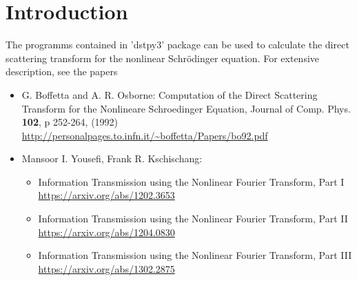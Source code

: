\documentclass{article}
\begin{document}
\section{Introduction}
The programms contained in 'dstpy3' package can be used to calculate the direct scattering transform for the nonlinear Schr\"odinger equation.
For extensive description, see the papers 
\begin{itemize}
\item G. Boffetta and A. R. Osborne:	 Computation of the Direct Scattering Transform for the Nonlineare Schroedinger Equation, Journal of Comp. Phys. {\bf 102}, p 252-264, (1992)	  \\
\url{http://personalpages.to.infn.it/~boffetta/Papers/bo92.pdf}

\item Mansoor I. Yousefi, Frank R. Kschischang:	 
\begin{itemize}
   \item Information Transmission using the Nonlinear Fourier Transform, Part I
										 \url{https://arxiv.org/abs/1202.3653}
		\item Information Transmission using the Nonlinear Fourier Transform, Part II
											 \url{https://arxiv.org/abs/1204.0830}
\item 											 Information Transmission using the Nonlinear Fourier Transform, Part III
											 \url{https://arxiv.org/abs/1302.2875}
\end{itemize}
\end{itemize}
\end{document}
